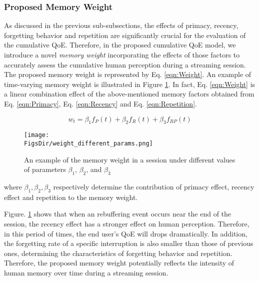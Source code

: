 \subsubsection{Proposed Memory Weight}

As discussed in the previous sub-subsections, the effects of primacy, recency, forgetting behavior and repetition are significantly crucial for the evaluation of the cumulative QoE. Therefore, in the proposed cumulative QoE model, we introduce a novel \textit{memory weight} incorporating the effects of those factors to accurately assess the cumulative human perception during a streaming session. The proposed memory weight is represented by Eq. \ref{eqn:Weight}. An example of time-varying memory weight is illustrated in Figure \ref{fig:ForgettingCurveRebuff}. In fact, Eq. \ref{eqn:Weight} is a linear combination effect of the above-mentioned memory factors obtained from Eq. \ref{eqn:Primacy}, Eq. \ref{eqn:Recency} and Eq. \ref{eqn:Repetition}.
    
\begin{equation} \label{eqn:Weight}
  w_{t} = \beta_{1}f_{P}(t) + \beta_{2}f_{R}(t) + \beta_{3}f_{RP}(t)
\end{equation}

\begin{figure}[tb]
  \begin{center}
    \texttt{[image: \\FigsDir/weight\_different\_params.png]}
  \end{center} 
  \caption{An example of the memory weight in a session under different values of parameters $\beta_{1}$, $\beta_{2}$, and $\beta_{3}$}
  \label{fig:ForgettingCurveRebuff}
\end{figure}


where $\beta_{1},\beta_{2},\beta_{3}$ respectively determine the contribution of primacy effect, recency effect and repetition to the memory weight.

Figure. \ref{fig:ForgettingCurveRebuff} shows that when an rebuffering event occurs near the end of the session, the recency effect has a stronger effect on human perception. Therefore, in this period of times, the end user's QoE will drops dramatically. In addition, the forgetting rate of a specific interruption is also smaller than those of previous ones, determining the characteristics of forgetting behavior and repetition. Therefore, the proposed memory weight potentially reflects the intensity of human memory over time during a streaming session.
